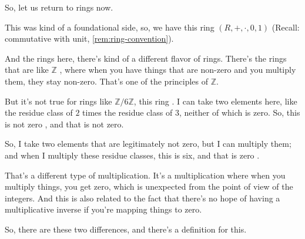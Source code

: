 \begin{speech}[00:11:03 - 00:12:35]
So, let us return to rings now. 

This was kind of a foundational side, so, we have this ring $(R, +, \cdot, 0, 1)$ (Recall: commutative with unit, \cref{rem:ring-convention}).

And the rings here, there's kind of a different flavor of rings. There's the rings that are like $\mathbb{Z}$ , where when you have things that are non-zero and you multiply them, they stay non-zero. That's one of the principles of $\mathbb{Z}$.

But it's not true for rings like $\mathbb{Z}/6\mathbb{Z}$, this ring . I can take two elements here, like the residue class of $2$ times the residue class of $3$, neither of which is zero. So, this is not zero , and that is not zero.

So, I take two elements that are legitimately not zero, but I can multiply them; and when I multiply these residue classes, this is six, and that is zero .

That's a different type of multiplication. It's a multiplication where when you multiply things, you get zero, which is unexpected from the point of view of the integers. And this is also related to the fact that there's no hope of having a multiplicative inverse if you're mapping things to zero.

So, there are these two differences, and there's a definition for this.
\end{speech}

